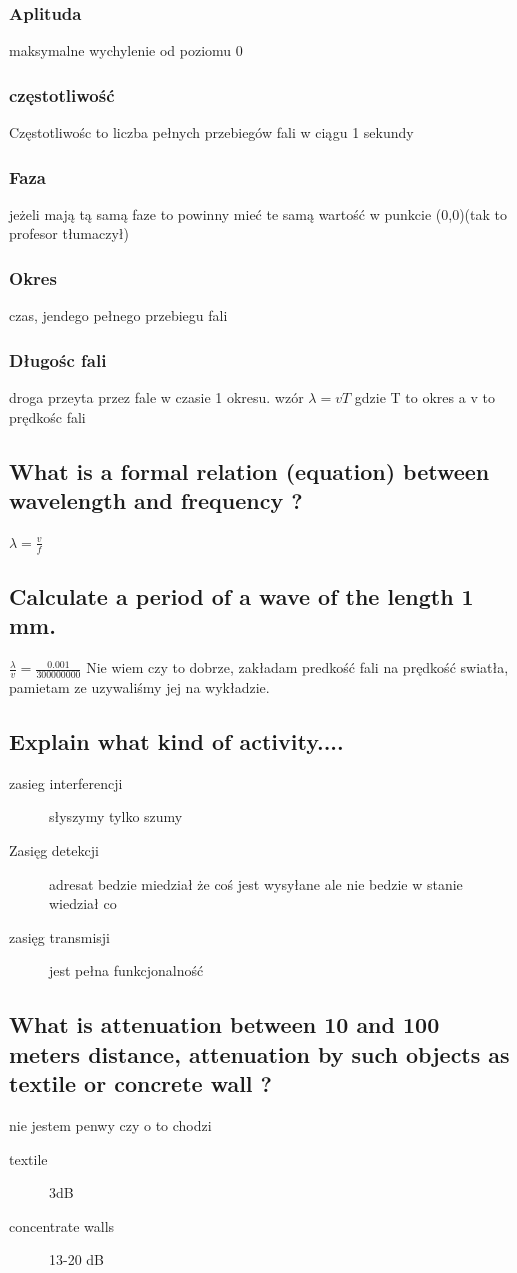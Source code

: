 \subsubsection{Aplituda}
maksymalne wychylenie od poziomu 0
\subsubsection{częstotliwość}
Częstotliwośc to liczba pełnych przebiegów fali w ciągu 1 sekundy
\subsubsection{Faza}
jeżeli mają tą samą faze to powinny mieć te samą wartość w punkcie (0,0)(tak to profesor tłumaczył)
\subsubsection{Okres}
czas, jendego pełnego przebiegu fali
\subsubsection{Długośc fali}
droga przeyta przez fale w czasie 1 okresu. wzór $\lambda=vT$  gdzie T to okres a v to prędkośc fali
\subsection{What is a formal relation (equation) between wavelength and frequency ?}
$\lambda=\frac{v}{f}$
\subsection{Calculate a period of a wave of the length 1 mm.}
$\frac{\lambda}{v}=\frac{0.001}{300 000 000}$
Nie wiem czy to dobrze, zakładam predkość fali na prędkość swiatła, pamietam ze uzywaliśmy jej na wykładzie.
\subsection{Explain what kind of activity....}
\begin{description}
\item[zasieg interferencji]słyszymy tylko szumy
\item[Zasięg detekcji]adresat bedzie miedział że coś jest wysyłane ale nie bedzie w stanie wiedział co
\item[zasięg transmisji]
jest pełna funkcjonalność
\end{description}
\subsection{What is attenuation between 10 and 100 meters distance, attenuation by such objects as textile or concrete wall ?}
nie jestem penwy czy o to chodzi
\begin{description}
\item[textile]3dB
\item[concentrate walls] 13-20 dB

\end{description}


